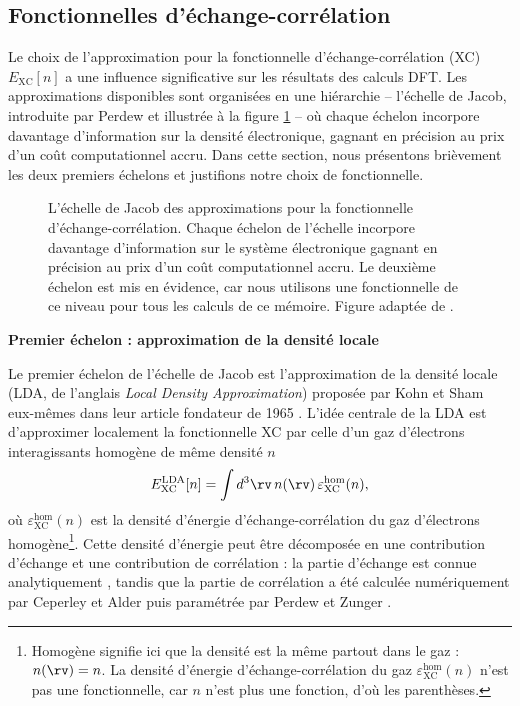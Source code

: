 \subsection{Fonctionnelles d'échange-corrélation}\label{sec:XC}

Le choix de l'approximation pour la fonctionnelle d'échange-corrélation (XC) $E_\text{XC}[n]$ a une influence significative sur les résultats des calculs DFT. Les approximations disponibles sont organisées en une hiérarchie -- l'échelle de Jacob, introduite par Perdew \cite{perdewJacobsLadderDensity2001} et illustrée à la figure \ref{fig:jacob} -- où chaque échelon incorpore davantage d'information sur la densité électronique, gagnant en précision au prix d'un coût computationnel accru. Dans cette section, nous présentons brièvement les deux premiers échelons et justifions notre choix de fonctionnelle. 
\begin{figure}[h]
    \centering
    
    \caption[L'échelle de Jacob des approximations pour la fonctionnelle d'échange-corrélation.]{L'échelle de Jacob des approximations pour la fonctionnelle d'échange-corrélation. Chaque échelon de l'échelle incorpore davantage d'information sur le système électronique gagnant en précision au prix d'un coût computationnel accru. Le deuxième échelon est mis en évidence, car nous utilisons une fonctionnelle de ce niveau pour tous les calculs de ce mémoire. Figure adaptée de \cite{perdewJacobsLadderDensity2001}.}
    \label{fig:jacob}
\end{figure}


\noindent
\textbf{Premier échelon : approximation de la densité locale}

Le premier échelon de l'échelle de Jacob est l'approximation de la densité locale (LDA, de l'anglais \textit{Local Density Approximation}) proposée par Kohn et Sham eux-mêmes dans leur article fondateur de 1965 \cite{kohnSelfConsistentEquationsIncluding1965}. L'idée centrale de la LDA est d'approximer localement la fonctionnelle XC par celle d'un gaz d'électrons interagissants homogène de même densité $n$ 
\begin{equation}
    E_\text{XC}^\text{LDA}[n]=\int d^3\rv\,n(\rv)\,\varepsilon_\text{XC}^\text{hom}(n),
    \label{eqn:c1_LDA}
\end{equation}
où $\varepsilon_\text{XC}^\text{hom}(n)$ est la densité d'énergie d'échange-corrélation du gaz d'électrons homogène\footnote{Homogène signifie ici que la densité est la même partout dans le gaz : $n(\rv)=n$. La densité d'énergie d'échange-corrélation du gaz $\varepsilon_\text{XC}^\text{hom}(n)$ n'est pas une fonctionnelle, car $n$ n'est plus une fonction, d'où les parenthèses.}. Cette densité d'énergie peut être décomposée en une contribution d'échange et une contribution de corrélation : la partie d'échange est connue analytiquement \cite{martinElectronicStructureBasic2004}, tandis que la partie de corrélation a été calculée numériquement par Ceperley et Alder \cite{ceperleyGroundStateElectron1980} puis paramétrée par Perdew et Zunger \cite{perdewSelfinteractionCorrectionDensityfunctional1981}.

